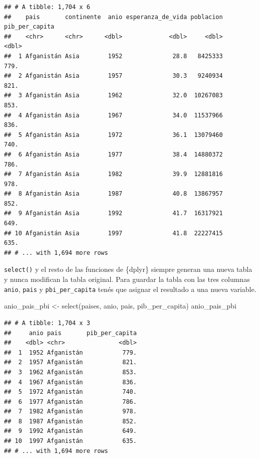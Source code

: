 \documentclass[
  openany]{book}
\newenvironment{Shaded}{\begin{snugshade}}{\end{snugshade}}
\newcommand{\FunctionTok}[1]{\textcolor[rgb]{0.00,0.00,0.00}{#1}}
\newcommand{\NormalTok}[1]{#1}
\newcommand{\OtherTok}[1]{\textcolor[rgb]{0.56,0.35,0.01}{#1}}
\begin{document}
\begin{verbatim}
## # A tibble: 1,704 x 6
##    pais       continente  anio esperanza_de_vida poblacion pib_per_capita
##    <chr>      <chr>      <dbl>             <dbl>     <dbl>          <dbl>
##  1 Afganistán Asia        1952              28.8   8425333           779.
##  2 Afganistán Asia        1957              30.3   9240934           821.
##  3 Afganistán Asia        1962              32.0  10267083           853.
##  4 Afganistán Asia        1967              34.0  11537966           836.
##  5 Afganistán Asia        1972              36.1  13079460           740.
##  6 Afganistán Asia        1977              38.4  14880372           786.
##  7 Afganistán Asia        1982              39.9  12881816           978.
##  8 Afganistán Asia        1987              40.8  13867957           852.
##  9 Afganistán Asia        1992              41.7  16317921           649.
## 10 Afganistán Asia        1997              41.8  22227415           635.
## # ... with 1,694 more rows
\end{verbatim}

\texttt{select()} y el resto de las funciones de \{dplyr\} siempre generan una nueva tabla y nunca modifican la tabla original.
Para guardar la tabla con las tres columnas \texttt{anio}, \texttt{pais} y \texttt{pbi\_per\_capita} tenés que asignar el resultado a una nueva variable.

\begin{Shaded}
\begin{Highlighting}[]
\NormalTok{anio\_pais\_pbi }\OtherTok{\textless{}{-}} \FunctionTok{select}\NormalTok{(paises, anio, pais, pib\_per\_capita)}
\NormalTok{anio\_pais\_pbi}
\end{Highlighting}
\end{Shaded}

\begin{verbatim}
## # A tibble: 1,704 x 3
##     anio pais       pib_per_capita
##    <dbl> <chr>               <dbl>
##  1  1952 Afganistán           779.
##  2  1957 Afganistán           821.
##  3  1962 Afganistán           853.
##  4  1967 Afganistán           836.
##  5  1972 Afganistán           740.
##  6  1977 Afganistán           786.
##  7  1982 Afganistán           978.
##  8  1987 Afganistán           852.
##  9  1992 Afganistán           649.
## 10  1997 Afganistán           635.
## # ... with 1,694 more rows
\end{verbatim}
\end{document}
